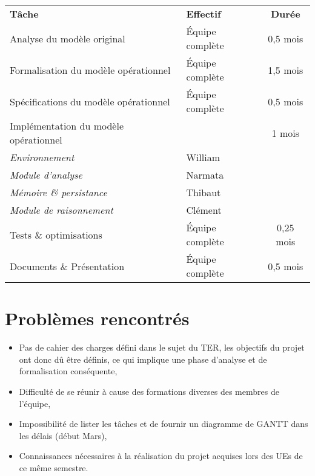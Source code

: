 \documentclass[a4paper,french,10pt]{article}
\begin{document}
\begin{tabular}{l l c}
\textbf{Tâche} & \textbf{Effectif} & \textbf{Durée} \\
Analyse du modèle original & Équipe complète & 0,5 mois \\
Formalisation du modèle opérationnel & Équipe complète & 1,5 mois \\
Spécifications du modèle opérationnel & Équipe complète & 0,5 mois \\
Implémentation du modèle opérationnel & & 1 mois \\
\hspace{1cm} \textit{Environnement} & William &  \\
\hspace{1cm} \textit{Module d'analyse} & Narmata & \\
\hspace{1cm} \textit{Mémoire \& persistance} & Thibaut & \\
\hspace{1cm} \textit{Module de raisonnement} & Clément & \\
Tests \& optimisations & Équipe complète & 0,25 mois \\
Documents \& Présentation & Équipe complète & 0,5 mois \\
\end{tabular}

\section{Problèmes rencontrés}
\begin{itemize}
\item Pas de cahier des charges défini dans le sujet du TER, les objectifs du projet ont donc dû être définis, ce qui implique une phase d'analyse et de formalisation conséquente,
\item Difficulté de se réunir à cause des formations diverses des membres de l'équipe,
\item Impossibilité de lister les tâches et de fournir un diagramme de GANTT dans les délais (début Mars),
\item Connaissances nécessaires à la réalisation du projet acquises lors des UEs de ce même semestre.
\end{itemize}
\end{document}
